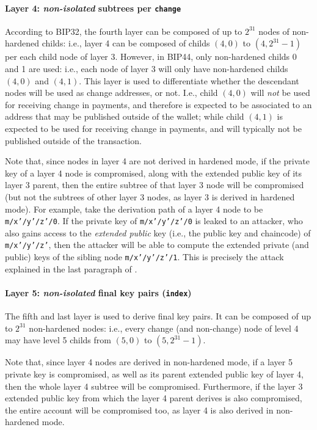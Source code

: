 \paragraph{Layer 4: \emph{non-isolated} subtrees per \texttt{change}}
According to BIP32, the fourth layer can be composed of up to  $2^{31}$ nodes of
non-hardened childs: i.e., layer 4 can be composed of childs $(4,0)$ to
$(4,2^{31}-1)$ per each child node of layer 3. However, in BIP44, only
non-hardened childs 0 and 1 are used: i.e., each node of layer 3 will only have
non-hardened childs $(4,0)$ and $(4,1)$. This layer is used to differentiate
whether the descendant nodes will be used as change addresses, or not. I.e.,
child $(4,0)$ will \emph{not} be used for receiving change in payments, and
therefore is expected to be associated to an address that may be published
outside of the wallet; while child $(4,1)$ is expected to be used for receiving
change in payments, and will typically not be published outside of the
transaction.

Note that, since nodes in layer 4 are not derived in hardened mode, if the private
key of a layer 4 node is compromised, along with the extended public key of its
layer 3 parent, then the entire subtree of that layer 3 node will be compromised
(but not the subtrees of other layer 3 nodes, as layer 3 is derived in hardened
mode). For example, take the derivation path of a layer 4 node to be
\texttt{m/x'/y'/z'/0}. If the private key of \texttt{m/x'/y'/z'/0} is leaked to
an attacker, who also gains access to the \emph{extended public} key (i.e.,
the public key and chaincode) of \texttt{m/x'/y'/z'}, then the attacker will
be able to compute the extended private (and public) keys of the sibling node
\texttt{m/x'/y'/z'/1}. This is precisely the attack explained in the last
paragraph of .

\paragraph{Layer 5: \emph{non-isolated} final key pairs (\texttt{index})} %
The fifth and last layer is used to derive final key pairs. It can be composed
of up to $2^{31}$ non-hardened nodes: i.e., every change (and non-change) node
of level 4 may have level 5 childs from $(5,0)$ to $(5,2^{31}-1)$.

Note that, since layer 4 nodes are derived in non-hardened mode, if a layer 5
private key is compromised, as well as its parent extended public key of layer
4, then the whole layer 4 subtree will be compromised. Furthermore, if the
layer 3 extended public key from which the layer 4 parent derives is also
compromised, the entire account will be compromised too, as layer 4 is also
derived in non-hardened mode.

